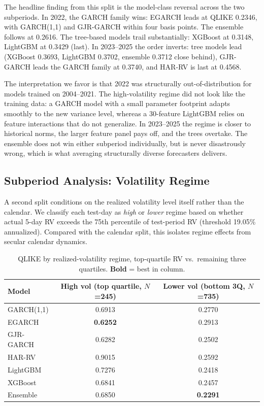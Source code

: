 The headline finding from this split is the model-class reversal across the two subperiods. In 2022, the GARCH family wins: EGARCH leads at QLIKE 0.2346, with GARCH(1,1) and GJR-GARCH within four basis points. The ensemble follows at 0.2616. The tree-based models trail substantially: XGBoost at 0.3148, LightGBM at 0.3429 (last). In 2023--2025 the order inverts: tree models lead (XGBoost 0.3693, LightGBM 0.3702, ensemble 0.3712 close behind), GJR-GARCH leads the GARCH family at 0.3740, and HAR-RV is last at 0.4568.

The interpretation we favor is that 2022 was structurally out-of-distribution for models trained on 2004--2021. The high-volatility regime did not look like the training data: a GARCH model with a small parameter footprint adapts smoothly to the new variance level, whereas a 30-feature LightGBM relies on feature interactions that do not generalize. In 2023--2025 the regime is closer to historical norms, the larger feature panel pays off, and the trees overtake. The ensemble does not win either subperiod individually, but is never disastrously wrong, which is what averaging structurally diverse forecasters delivers.

\subsection{Subperiod Analysis: Volatility Regime}

A second split conditions on the realized volatility level itself rather than the calendar. We classify each test-day as \emph{high} or \emph{lower} regime based on whether actual 5-day RV exceeds the 75th percentile of test-period RV (threshold 19.05\% annualized). Compared with the calendar split, this isolates regime effects from secular calendar dynamics.

\begin{table}[H]
\centering
\small
\caption{QLIKE by realized-volatility regime, top-quartile RV vs.\ remaining three quartiles. \textbf{Bold} = best in column.}
\label{tab:subperiod_regime}
\begin{tabular}{l c c}
\toprule
\textbf{Model} & \shortstack{\textbf{High vol}\\\textbf{(top quartile, $N$=245)}} & \shortstack{\textbf{Lower vol}\\\textbf{(bottom 3Q, $N$=735)}} \\
\midrule
GARCH(1,1)   & 0.6913          & 0.2770          \\
EGARCH       & \textbf{0.6252} & 0.2913          \\
GJR-GARCH    & 0.6282          & 0.2502          \\
HAR-RV       & 0.9015          & 0.2592          \\
LightGBM     & 0.7276          & 0.2418          \\
XGBoost      & 0.6841          & 0.2457          \\
Ensemble     & 0.6850          & \textbf{0.2291} \\
\bottomrule
\end{tabular}
\end{table}

